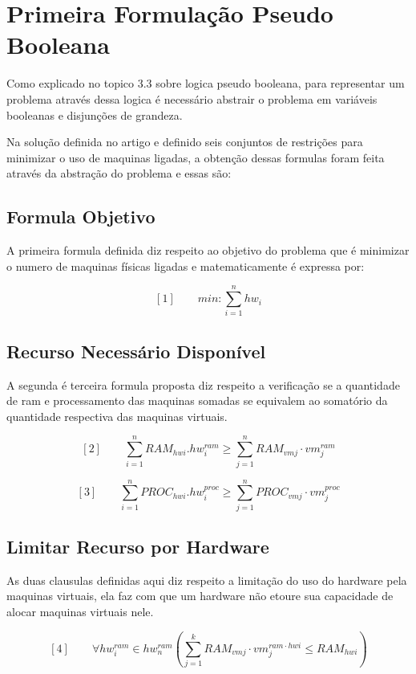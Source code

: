 \section{Primeira Formulação Pseudo Booleana}

Como explicado no topico 3.3 sobre logica pseudo booleana, para representar um problema através dessa logica é necessário abstrair o problema em variáveis booleanas e disjunções de grandeza.

Na solução definida no artigo \cite{bruno2012} e definido seis conjuntos de restrições para minimizar o uso de maquinas ligadas, a obtenção dessas formulas foram feita através da abstração do problema e essas são:
 
 \subsection{Formula Objetivo}
 
 A primeira formula definida diz respeito ao objetivo do problema que é minimizar o numero de maquinas físicas ligadas e matematicamente é expressa por: 
 
 $$[1] \qquad min: \sum_{i=1}^{n} hw_{i}$$	


 \subsection{Recurso Necessário Disponível}
 
 A segunda é terceira formula proposta diz respeito a verificação se a quantidade de ram e processamento das maquinas somadas se equivalem ao somatório da quantidade respectiva das maquinas virtuais. 

 $$[2] \qquad \sum_{i=1}^{n} RAM_{hwi} . hw_{i}^{ram} \geq \sum_{j=1}^{n} RAM_{vmj} \cdot vm_{j}^{ram} $$	


 $$[3] \qquad  \sum_{i=1}^{n} PROC_{hwi} . hw_{i}^{proc} \geq \sum_{j=1}^{n} PROC_{vmj} \cdot vm_{j}^{proc} $$	
 
 
 \subsection{Limitar Recurso por Hardware}

As duas clausulas definidas aqui diz respeito a limitação do uso do hardware pela maquinas virtuais, ela faz com que um hardware não etoure sua capacidade de alocar maquinas virtuais nele.  
 
 $$[4] \qquad \forall hw_{i}^{ram} \in hw_{n}^{ram} (\sum_{j = 1}^{k}  RAM_{vmj}
\cdot vm^{ram \cdot hwi}_{j} \leq RAM_{hwi})  $$


